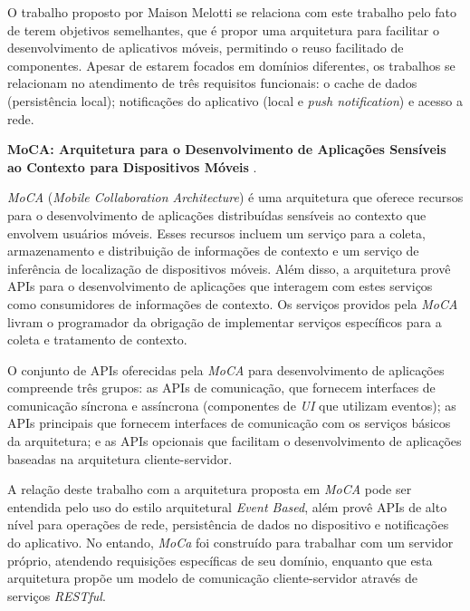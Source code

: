 O trabalho proposto por Maison Melotti se relaciona com este trabalho pelo fato de terem objetivos semelhantes, que é propor uma arquitetura para facilitar o desenvolvimento de aplicativos móveis, permitindo o reuso facilitado de componentes. Apesar de estarem focados em domínios diferentes, os trabalhos se relacionam no atendimento de três requisitos funcionais: o cache de dados (persistência local); notificações do aplicativo (local e \textit{push notification}) e acesso a rede.\par


\textbf{MoCA: Arquitetura para o Desenvolvimento de Aplicações Sensíveis ao Contexto para Dispositivos Móveis} \cite{moca2004}.\par
\textit{MoCA} (\textit{Mobile Collaboration Architecture}) é uma arquitetura que oferece recursos para o desenvolvimento de aplicações distribuídas sensíveis ao contexto que envolvem usuários móveis. Esses recursos incluem um serviço para a coleta, armazenamento e distribuição de informações de contexto e um serviço de inferência de localização de dispositivos móveis. Além disso, a arquitetura provê APIs para o desenvolvimento de aplicações que interagem com estes serviços como consumidores de informações de contexto. Os serviços providos pela \textit{MoCA} livram o programador da obrigação de implementar serviços específicos para a coleta e tratamento de contexto.\par

O conjunto de APIs oferecidas pela \textit{MoCA} para desenvolvimento de aplicações compreende três grupos: as APIs de comunicação, que fornecem interfaces de comunicação síncrona e assíncrona (componentes de \textit{UI} que utilizam eventos); as APIs principais que fornecem interfaces de comunicação com os serviços básicos da arquitetura; e as APIs opcionais que facilitam o desenvolvimento de aplicações baseadas na arquitetura cliente-servidor.\par

A relação deste trabalho com a arquitetura proposta em \textit{MoCA} pode ser entendida pelo uso do estilo arquitetural \textit{Event Based}, além provê APIs de alto nível para operações de rede, persistência de dados no dispositivo e notificações do aplicativo. No entando, \textit{MoCa} foi construído para trabalhar com um servidor próprio, atendendo requisições específicas de seu domínio, enquanto que esta arquitetura propõe um modelo de comunicação cliente-servidor através de serviços \textit{RESTful}.\par


